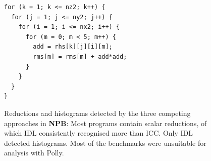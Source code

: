\begin{figure}[H]
\begin{lstlisting}[language=MyCpp, label={missedscalar}, caption=
   {Some reductions were missed by all detection approaches.
    In this loop from ``SP'', the outer loops are reduction loops, accumulating
    into scalar variables
    ``{\tt rms[0]}'',\dots,``{\tt rms[4]}'',
    but the innermost loop is not a reduction, and it is therefore not captured
    by the IDL specification.}]
for (k = 1; k <= nz2; k++) {
  for (j = 1; j <= ny2; j++) {
    for (i = 1; i <= nx2; i++) {
      for (m = 0; m < 5; m++) {
        add = rhs[k][j][i][m];
        rms[m] = rms[m] + add*add;
      } 
    } 
  } 
}
\end{lstlisting}
\end{figure}

\begin{figure}[p]
  \centering
    \caption{Reductions and histograms detected by the three competing
             approaches in {\bf NPB}:
             Most programs contain scalar reductions, of which IDL consistently
             recognised more than ICC.
             Only IDL detected histograms.
             Most of the benchmarks were unsuitable for analysis with Polly.}
    \label{npb_spotted}
    \vspace{2.7mm}

\end{figure}
